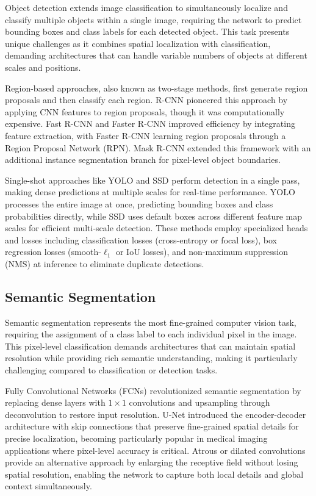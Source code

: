 Object detection extends image classification to simultaneously localize and classify multiple objects within a single image, requiring the network to predict bounding boxes and class labels for each detected object. This task presents unique challenges as it combines spatial localization with classification, demanding architectures that can handle variable numbers of objects at different scales and positions.

Region-based approaches, also known as two-stage methods, first generate region proposals and then classify each region. R-CNN pioneered this approach by applying CNN features to region proposals, though it was computationally expensive. Fast R-CNN and Faster R-CNN improved efficiency by integrating feature extraction, with Faster R-CNN learning region proposals through a Region Proposal Network (RPN). Mask R-CNN extended this framework with an additional instance segmentation branch for pixel-level object boundaries.

Single-shot approaches like YOLO and SSD perform detection in a single pass, making dense predictions at multiple scales for real-time performance. YOLO processes the entire image at once, predicting bounding boxes and class probabilities directly, while SSD uses default boxes across different feature map scales for efficient multi-scale detection. These methods employ specialized heads and losses including classification losses (cross-entropy or focal loss), box regression losses (smooth-$\ell_1$ or IoU losses), and non-maximum suppression (NMS) at inference to eliminate duplicate detections.

\subsection{Semantic Segmentation}

Semantic segmentation represents the most fine-grained computer vision task, requiring the assignment of a class label to each individual pixel in the image. This pixel-level classification demands architectures that can maintain spatial resolution while providing rich semantic understanding, making it particularly challenging compared to classification or detection tasks.

Fully Convolutional Networks (FCNs) revolutionized semantic segmentation by replacing dense layers with $1\times1$ convolutions and upsampling through deconvolution to restore input resolution. U-Net introduced the encoder-decoder architecture with skip connections that preserve fine-grained spatial details for precise localization, becoming particularly popular in medical imaging applications where pixel-level accuracy is critical. Atrous or dilated convolutions provide an alternative approach by enlarging the receptive field without losing spatial resolution, enabling the network to capture both local details and global context simultaneously.

